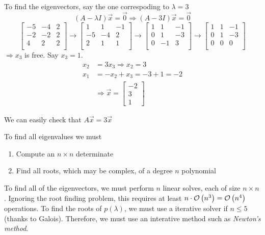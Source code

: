 To find the eigenvectors, say the one correspoding to $\lambda=3$
%
\begin{equation*}
  (A-\lambda I)\Vec{x} = \Vec{0} \Rightarrow (A - 3I)\Vec{x} = \Vec{0}
\end{equation*}
%
\begin{equation*}
  \begin{bmatrix}
    -5 & -4 & 2 \\
    -2 & -2 & 2 \\
    4  & 2  & 2 \\
  \end{bmatrix}
  \rightarrow
  \begin{bmatrix}
    1  & 1  & -1 \\
    -5 & -4 & 2 \\
    2  & 1  & 1 \\
  \end{bmatrix}
  \rightarrow
  \begin{bmatrix}
    1 & 1  & -1 \\
    0 & 1  & -3 \\
    0 & -1 & 3 \\
  \end{bmatrix}
  \rightarrow
  \begin{bmatrix}
    1 & 1  & -1 \\
    0 & 1  & -3 \\
    0 & 0  & 0 \\
  \end{bmatrix}
\end{equation*}
%
$\Rightarrow x_3$ is free. Say $x_3=1$.
%
\begin{align*}
  x_2 &= 3x_3 \Rightarrow x_2=3\\
  x_1 &= -x_2 + x_3 = -3 + 1 = -2 \\
  & \Rightarrow \Vec{x} = \begin{bmatrix}-2\\3\\1\end{bmatrix}
\end{align*}

We can easily check that $A\Vec{x}=3\Vec{x}$

To find all eigenvalues we must
\begin{enumerate}[1)]
  \item Compute an $n\times n$ determinate
  \item Find all roots, which may be complex, of a degree $n$ polynomial
\end{enumerate}
%
To find all of the eigenvectors, we must perform $n$ linear solves, each of size
$n\times n$.  
Ignoring the root finding problem, this requires at least $n\cdot
\mathcal{O}\left(n^3\right)=\mathcal{O}\left(n^4\right)$ operations.  
To find the roots of $p(\lambda)$, we must use a iterative solver if $n\leq 5$ (thanks to Galois).
Therefore, we must use an interative method such as \emph{Newton's method}.

